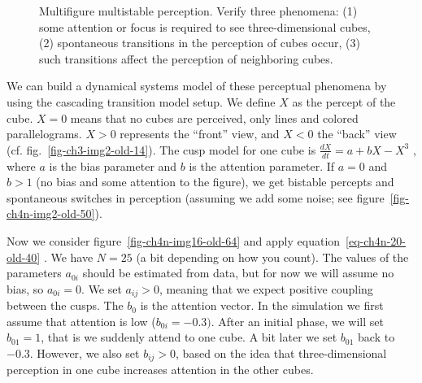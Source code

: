 \documentclass[
  a4paper,
  DIV=11,
  numbers=noendperiod,
  oneside]{scrreprt}
\begin{document}
\begin{figure}


\caption{\label{fig-ch4n-img18-old-66}Multifigure multistable
perception. Verify three phenomena: (1) some attention or focus is
required to see three-dimensional cubes, (2) spontaneous transitions in
the perception of cubes occur, (3) such transitions affect the
perception of neighboring cubes.}

\end{figure}%

We can build a dynamical systems model of these perceptual phenomena by
using the cascading transition model setup. We define \(X\) as the
percept of the cube. \(X = 0\) means that no cubes are perceived, only
lines and colored parallelograms. \(X > 0\) represents the ``front''
view, and \(X < 0\) the ``back'' view (cf.
fig.~\ref{fig-ch3-img2-old-14}). The cusp model for one cube is
\(\frac{dX}{dt} = {a + bX - X}^{3}\) , where \(a\) is the bias parameter
and \(b\) is the attention parameter. If \(a = 0\) and \(b > 1\) (no
bias and some attention to the figure), we get bistable percepts and
spontaneous switches in perception (assuming we add some noise; see
figure~\ref{fig-ch4n-img2-old-50}).

Now we consider figure~\ref{fig-ch4n-img16-old-64} and apply
equation~\ref{eq-ch4n-20-old-40} . We have \(N = 25\) (a bit depending
on how you count). The values of the parameters \(a_{0i}\) should be
estimated from data, but for now we will assume no bias, so
\(a_{0i} = 0\). We set \(a_{ij} > 0\), meaning that we expect positive
coupling between the cusps. The \(b_{0}\) is the attention vector. In
the simulation we first assume that attention is low
(\(b_{0i} = -0.3)\). After an initial phase, we will set \(b_{01} = 1\),
that is we suddenly attend to one cube. A bit later we set \(b_{01}\)
back to \(-0.3\). However, we also set \(b_{ij} > 0\), based on the idea
that three-dimensional perception in one cube increases attention in the
other cubes.
\end{document}
